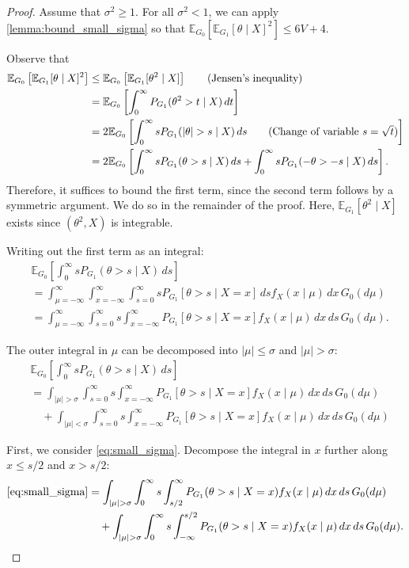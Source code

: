 \documentclass[10pt,a4paper]{amsart}
\newcommand{\E}{\mathbb{E}}
\newcommand{\bk}[1]{\left[{#1}\right]}
\begin{document}
\begin{proof}
Assume that $ \sigma^2 \ge 1 $. For all $\sigma^2 < 1$, we can apply 
\cref{lemma:bound_small_sigma}
so that $\E_{G_0}\bk{\E_{G_1}[\theta\mid X]^2} \le 6V + 4$. 

Observe that \begin{align*}
\E_{G_0}\bk{\E_{G_1} [\theta \mid X]^2} &\le \E_{G_0} \bk{\E_{G_1}[\theta^2 \mid X]}  \tag{Jensen's
inequality} \\
&= \E_{G_0}\bk{\int_{0}^\infty P_{G_1}(\theta^2 > t \mid X) \,dt} \\
&= 2\E_{G_0}\bk{\int_0^\infty s P_{G_1}(|\theta| > s \mid X)\,ds \tag{Change of variable $s
=
\sqrt{t}$}}
\\
&= 2\E_{G_0}\bk{\int_0^\infty s P_{G_1}(\theta > s \mid X)\,ds + \int_0^\infty s P_{G_1}
(-\theta > -s
\mid X)\,ds}.
\end{align*}
Therefore, it suffices to bound the first term, since the second term follows by a
symmetric argument. We do so in the remainder of the proof. Here, $\E_{G_1}[\theta^2
\mid X]$ exists since $(\theta^2, X)$ is integrable. 

Writing out the first term as an integral:
\begin{align*} &\E_{G_0}
\bk{\int_0^\infty s P_ {G_1} (\theta > s \mid
X)\,ds} \\ &= \int_ {\mu=-\infty}^\infty\int_{x=-\infty}^\infty \int_{s=0}^\infty  s
P_{G_1}[\theta > s
\mid
X=x]\, ds f_X (x\mid \mu)
\,dx\,G_0(d\mu)\\
&= \int_
{\mu=-\infty}^\infty  \int_{s=0}^\infty s \int_{x=-\infty}^\infty P_{G_1}[\theta > s
\mid
X=x]  f_X (x\mid \mu) \,dx \,ds \,G_0(d\mu). \tag{Fubini's theorem}
\end{align*}

The outer integral in $\mu$ can be decomposed into $|\mu| \le \sigma$ and $|\mu| >
\sigma$: \begin{align}
&\E_{G_0}\bk{\int_0^\infty s P_ {G_1} (\theta > s \mid
X)\,ds} \nonumber\\
&= \int_
{|\mu| > \sigma}  \int_{s=0}^\infty s \int_{x=-\infty}^\infty P_{G_1}[\theta > s
\mid
X=x]  f_X (x\mid \mu) \,dx \,ds \,G_0(d\mu)\label{eq:small_sigma}
\\
&\quad+ \int_
{|\mu| < \sigma} \int_{s=0}^\infty s \int_{x=-\infty}^\infty P_{G_1}[\theta > s
\mid
X=x]  f_X (x\mid \mu) \,dx \,ds \,G_0(d\mu) \label{eq:large_sigma}
\end{align}

First, we consider \eqref{eq:small_sigma}. Decompose the integral in $x$ further along $x
\le s/2$ and $x > s/2$: 
\begin{align}
\eqref{eq:small_sigma} &= \int_{|\mu| > \sigma} \int_0^\infty s \int_{s/2}^{\infty}P_{G_1}
(\theta > s
\mid X=x) f_X(x\mid \mu) \,dx \,ds \,G_0(d\mu)\label{eq:term3}
\\&\quad + \int_{|\mu| > \sigma} \int_0^\infty s \int_{-\infty}^{s/2} P_{G_1}
(\theta > s
\mid X=x) f_X(x\mid \mu) \,dx \,ds\,G_0(d\mu) \label{eq:term2_}.
\end{align}


\end{proof}
\end{document}
